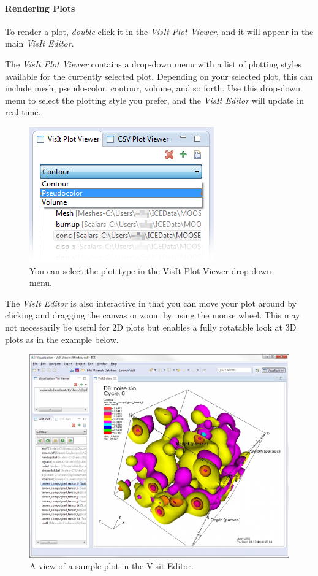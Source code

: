 \paragraph{Rendering Plots}\label{rendering-plots}

To render a plot, \emph{double} click it in the \emph{VisIt Plot
Viewer}, and it will appear in the main \emph{VisIt Editor}.

The \emph{VisIt Plot Viewer} contains a drop-down menu with a list of
plotting styles available for the currently selected plot. Depending on
your selected plot, this can include mesh, pseudo-color, contour,
volume, and so forth. Use this drop-down menu to select the plotting
style you prefer, and the \emph{VisIt Editor} will update in real time.

\begin{figure}[htbp]
\centering
\includegraphics{figures/ICE_VisItPlotStyleMenu.png}
\caption{You can select the plot type in the VisIt Plot Viewer drop-down menu.}
\end{figure}

The \emph{VisIt Editor} is also interactive in that you can move your
plot around by clicking and dragging the canvas or zoom by using the
mouse wheel. This may not necessarily be useful for 2D plots but enables
a fully rotatable look at 3D plots as in the example below.

\begin{figure}[htbp]
\centering
\includegraphics[width=\textwidth]{figures/ICE_VisIt3DNoise.png}
\caption{A view of a sample plot in the Visit Editor.}
\end{figure}

